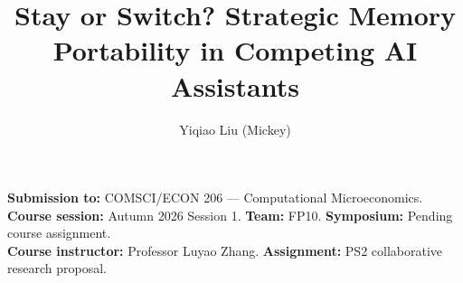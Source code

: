 \documentclass[sigconf,nonacm]{acmart}
\title{Stay or Switch? Strategic Memory Portability in Competing AI Assistants}
\author{Yiqiao Liu (Mickey)}
\affiliation{\institution{Duke Kunshan University}\city{Kunshan}\country{China}}
\newcommand{\CourseNumber}{COMSCI/ECON 206}
\newcommand{\CourseName}{Computational Microeconomics}
\newcommand{\CourseSession}{Autumn 2026 Session 1}
\newcommand{\Instructor}{Professor Luyao Zhang}
\newcommand{\TeamCode}{FP10}
\newcommand{\SymposiumSession}{Pending course assignment}
\newcommand{\coursemeta}{\noindent\textbf{Submission to:} \CourseNumber{} --- \CourseName.\\
\textbf{Course session:} \CourseSession. \textbf{Team:} \TeamCode. \textbf{Symposium:} \SymposiumSession.\\
\textbf{Course instructor:} \Instructor. \textbf{Assignment:} PS2 collaborative research proposal.\par\smallskip}
\begin{document}
\begin{teaserfigure}
\captionsetup{skip=8pt}
\centering

\caption{Evidence chain for strategic memory portability. The platform game, computation, welfare/incentive comparisons, allocation analogy, and review-ready A0 poster are completed in the canonical repository. The public Stay/Switch artifact structures a separate user test; behavioral inference and symposium evidence remain planned.}
\label{fig:teaser}
\end{teaserfigure}
\maketitle\raggedbottom\coursemeta



\end{document}
